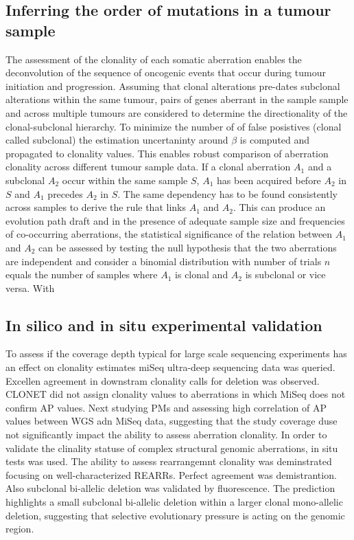 	\subsection{Inferring the order of mutations in a tumour sample}
	The assessment of the clonality of each somatic aberration enables the deconvolution of the sequence of oncogenic events that occur during tumour initiation and progression.
	Assuming that clonal alterations pre-dates subclonal alterations within the same tumour, pairs of genes aberrant in the sample sample and across multiple tumours are considered to determine the directionality of the clonal-subclonal hierarchy.
	To minimize the number of of false posistives (clonal called subclonal) the estimation uncertaninty around $\beta$ is computed and propagated to clonality values.
	This enables robust comparison of aberration clonality across different tumour sample data.
	If a clonal aberration $A_1$ and a subclonal $A_2$ occur within the same sample $S$, $A_1$ has been acquired before $A_2$ in $S$ and $A_1$ precedes $A_2$ in $S$.
	The same dependency has to be found consistently across samples to derive the rule that links $A_1$ and $A_2$.
	This can produce an evolution path draft and in the presence of adequate sample size and frequencies of co-occurring aberrations, the statistical significance of the relation between $A_1$ and $A_2$ can be assessed by testing the null hypothesis that the two aberrations are independent and consider a binomial distribution  with number of trials $n$ equals the number of samples where $A_1$ is clonal and $A_2$ is subclonal or vice versa.
	With

	\subsection{In silico and in situ experimental validation}
	To assess if the coverage depth typical for large scale sequencing experiments has an effect on clonality estimates miSeq ultra-deep sequencing data was queried.
	Excellen agreement in downstram clonality calls for deletion was observed.
	CLONET did not assign clonality values to aberrations in which MiSeq does not confirm AP values.
	Next studying PMs and assessing high correlation of AP values between WGS adn MiSeq data, suggesting that the study coverage duse not significantly impact the ability to assess aberration clonality.
	In order to validate the clinality statuse of complex structural genomic aberrations, in situ tests was used.
	The ability to assess rearrangemnt clonality was deminstrated focusing on well-characterized REARRs.
	Perfect agreement was demistrantion.
	Also subclonal bi-allelic deletion was validated by fluorescence.
	The prediction highlights a small subclonal bi-allelic deletion within a larger clonal mono-allelic deletion, suggesting that selective evolutionary pressure is acting on the genomic region.

